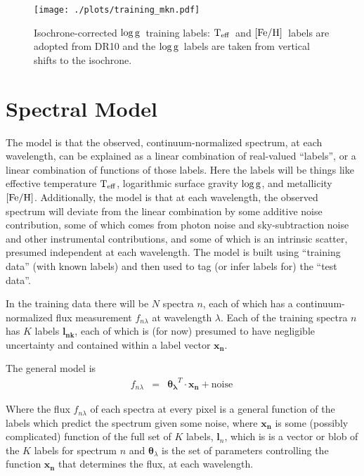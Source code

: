 \documentclass[12pt, preprint]{aastex}
\newcommand{\set}[1]{\bm{#1}}
\newcommand{\teff}{\mbox{$\rm T_{eff}$}}
\newcommand{\feh}{\mbox{$\rm [Fe/H]$}}
\newcommand{\logg}{\mbox{$\rm \log g$}}
\begin{document}
\begin{figure}[h!]
\centering
  \texttt{[image: ./plots/training\_mkn.pdf]}
\caption{Isochrone-corrected \logg\ training labels: \teff\ and \feh\ labels are adopted from DR10 and the \logg\ labels are taken from vertical shifts to the isochrone. }
\label{fig:trainingisochrone}
\end{figure}


\section{Spectral Model}
\label{sec:spectralmodel}

The model is that the observed, continuum-normalized spectrum, at each
wavelength, can be explained as a linear combination of real-valued
``labels'', or a linear combination of functions of those labels.
Here the labels will be things like effective temperature $\teff$,
logarithmic surface gravity $\logg$, and metallicity $\feh$.
Additionally, the model is that at each wavelength, the observed
spectrum will deviate from the linear combination by some additive
noise contribution, some of which comes from photon noise and
sky-subtraction noise and other instrumental contributions, and some
of which is an intrinsic scatter, presumed independent at each
wavelength.
The model is built using ``training data'' (with known labels) and then
used to tag (or infer labels for) the ``test data''.

In the training data there will be $N$ spectra $n$, each of which has
a continuum-normalized flux measurement $f_{n\lambda}$ at wavelength
$\lambda$. Each of the training spectra $n$ has $K$ labels $\boldsymbol{l_{nk}}$, each of which
is (for now) presumed to have negligible uncertainty and contained within a label vector $\boldsymbol{x_n}$.

The general model is
\begin{eqnarray}
f_{n\lambda} &=&
\boldsymbol{\theta_\lambda}^T \cdot \boldsymbol{x_n} + \mbox{noise}
\
\end{eqnarray}

Where the flux $f_{n\lambda}$ of each spectra at every pixel is a general function of the labels which predict the spectrum given some noise, where $\boldsymbol{x_n}$ is some (possibly complicated) function of the full set of $K$ labels, $\set{l}_n$, which is is a vector or blob of the $K$ labels for spectrum $n$ and $\set{\theta}_\lambda$ is the set of parameters controlling the function $\boldsymbol{x_n}$ that determines the flux, at each wavelength.
\end{document}
